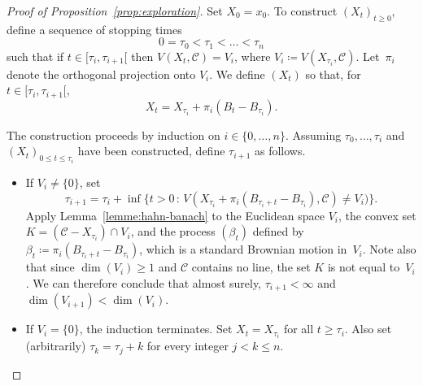 \documentclass[10pt,a4paper]{amsart}
\newcommand{\iy}{\infty}
\renewcommand{\leq}{\leqslant}
\renewcommand{\geq}{\geqslant}
\begin{document}
\begin{proof}[Proof of Proposition~\ref{prop:exploration}]
Set $X_0=x_0$. To construct $(X_t)_{t \geq 0}$, define a sequence of stopping times
\[ 0 = \tau_0 < \tau_1 < \dots < \tau_n \]
such that if $t \in [\tau_i,\tau_{i+1}[$ then $V(X_t,\mathscr{C}) = V_i$, where $V_i \coloneqq V(X_{\tau_{i}},\mathscr{C})$.
Let~$\pi_i$ denote the orthogonal projection onto $V_i$. We define $(X_t)$ so that, for $t \in [\tau_i,\tau_{i+1}[$,
\[ X_t = X_{\tau_i}+ \pi_i(B_t-B_{\tau_{i}}) .\]
 
The construction proceeds by induction on $i \in \{0,\dots,n\}$. Assuming $\tau_0,\dots,\tau_{i}$ and $(X_t)_{0 \leq t \leq \tau_{i}}$ have been constructed, define $\tau_{i+1}$ as follows.
\begin{itemize}
\item If $V_i \neq \{0\}$, set
\[ \tau_{i+1} = \tau_{i} + \inf \{ t > 0 \, : \, V(X_{\tau_{i}} + \pi_i(B_{\tau_i+t} - B_{\tau_{i}}),\mathscr{C}) \neq V_i) \} .\]
Apply Lemma~\ref{lemme:hahn-banach} to the Euclidean space $V_i$, the convex set $K = (\mathscr{C}-X_{\tau_i}) \cap V_i$, and the process $(\beta_t)$ defined by $\beta_t \coloneqq \pi_i(B_{\tau_i+t} - B_{\tau_{i}})$, which is a standard Brownian motion in~$V_i$. Note also that since $\dim (V_i) \geq 1$ and $\mathscr{C}$ contains no line, the set $K$ is not equal to~$V_i$. We can therefore conclude that almost surely, $\tau_{i+1} < \iy $ and $\dim (V_{i+1}) < \dim(V_i)$.
\item If $V_i= \{0\}$, the induction terminates. Set $X_t = X_{\tau_i}$ for all $t \geq \tau_i$. Also set
(arbitrarily) $\tau_{k}=\tau_j+k$ for every integer $j < k \leq n$.
\end{itemize}
 

\end{proof}
\end{document}
